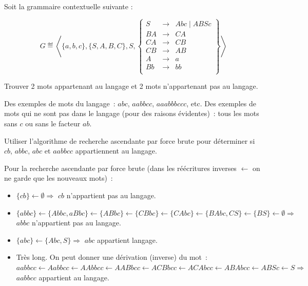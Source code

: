 
\begingroup

\begin{exercice}\label{exo:/languages/grammars/brute_force}

  Soit la grammaire contextuelle suivante :

  $$G \eqdef \left\langle\{a, b, c\}, \{S, A, B, C\}, S,
  \left\{\begin{array}{lll}
  S   &\rightarrow& Abc \mid  ABSc\\
  BA  &\rightarrow& CA\\
  CA  &\rightarrow& CB\\
  CB  &\rightarrow& AB\\
  A  &\rightarrow& a\\
  Bb  &\rightarrow& bb\\
  \end{array}\right\} \right\rangle$$
  
  \begin{questions}
  \item Trouver 2 mots appartenant au langage et 2 mots n'appartenant pas au langage.
  \end{questions}
  \begin{corrections}
    Des exemples de
    mots du langage~: $abc$, $aabbcc$, $aaabbbccc$, etc. Des exemples de mots
    qui ne sont pas dans le langage (pour des raisons évidentes)~: tous les mots sans $c$
    ou sans le facteur $ab$. 
  \end{corrections}
  
  \begin{questions}
  \item Utiliser l'algorithme de recherche ascendante par force brute pour
    déterminer si $cb$, $abbc$, $abc$ et $aabbcc$ appartiennent au langage.
  \end{questions}
  \begin{corrections}
    Pour la recherche ascendante par force brute
    (dans les réécritures inverses $\leftarrow$ 
    on ne garde que les nouveaux mots)~:
    \begin{itemize}
    \item $\{cb\} \leftarrow \emptyset \Rightarrow$ $cb$ n'appartient pas au langage.
    \item $\{abbc\} \leftarrow \{Abbc, aBbc\} \leftarrow
      \{ABbc\} \leftarrow \{CBbc\} \leftarrow \{CAbc\}
      \leftarrow \{BAbc, CS\} \leftarrow \{BS\} \leftarrow \emptyset
      \Rightarrow$ $abbc$ n'appartient pas au langage.
    \item $\{abc\} \leftarrow \{Abc, S\} \Rightarrow$ $abc$ appartient langage.
    \item Très long. On peut donner une dérivation (inverse) du mot~:
      $aabbcc \leftarrow Aabbcc \leftarrow AAbbcc \leftarrow AABbcc 
      \leftarrow ACBbcc \leftarrow ACAbcc \leftarrow ABAbcc \leftarrow ABSc \leftarrow S\Rightarrow$  $aabbcc$ appartient au langage.
    \end{itemize}
  \end{corrections}


\end{exercice}
